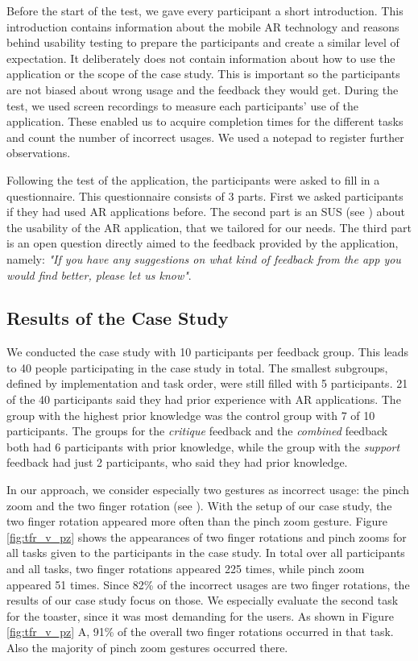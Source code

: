 \documentclass[11pt, a4paper]{article}
\begin{document}
			Before the start of the test, we gave every participant a short introduction. This introduction contains information about the mobile \ac{AR} technology and reasons behind usability testing to prepare the participants and create a similar level of expectation. It deliberately does not contain information about how to use the application or the scope of the case study. This is important so the participants are not biased about wrong usage and the feedback they would get. During the test, we used screen recordings to measure each participants' use of the application. These enabled us to acquire completion times for the different tasks and count the number of incorrect usages. We used a notepad to register further observations.

			Following the test of the application, the participants were asked to fill in a questionnaire. This questionnaire consists of 3 parts. First we asked participants if they had used \ac{AR} applications before. The second part is an \ac{SUS} (see ) about the usability of the \ac{AR} application, that we tailored for our needs. The third part is an open question directly aimed to the feedback provided by the application, namely: \emph{"If you have any suggestions on what kind of feedback from the app you would find better, please let us know"}.

		\subsection*{Results of the Case Study}\label{ssec:results}

			We conducted the case study with 10 participants per feedback group. This leads to 40 people participating in the case study in total. The smallest subgroups, defined by implementation and task order, were still filled with 5 participants. 21 of the 40 participants said they had prior experience with \ac{AR} applications. The group with the highest prior knowledge was the control group with 7 of 10 participants. The groups for the \emph{critique} feedback and the \emph{combined} feedback both had 6 participants with prior knowledge, while the group with the \emph{support} feedback had just 2 participants, who said they had prior knowledge.

			In our approach, we consider especially two gestures as incorrect usage: the pinch zoom and the two finger rotation (see ). With the setup of our case study, the two finger rotation appeared more often than the pinch zoom gesture. Figure \ref{fig:tfr_v_pz} shows the appearances of two finger rotations and pinch zooms for all tasks given to the participants in the case study. In total over all participants and all tasks, two finger rotations appeared 225 times, while pinch zoom appeared 51 times. Since 82\% of the incorrect usages are two finger rotations, the results of our case study focus on those. We especially evaluate the second task for the toaster, since it was most demanding for the users. As shown in Figure \ref{fig:tfr_v_pz} A, 91\% of the overall two finger rotations occurred in that task. Also the majority of pinch zoom gestures occurred there.
\end{document}
